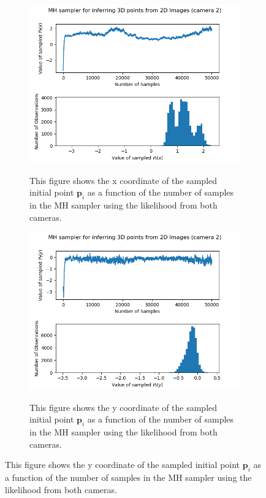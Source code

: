 \documentclass[10pt]{article}
\begin{document}
\begin{figure}[h!]
\centering
\begin{subfigure}[]{.320\textwidth}
  \centering
  \includegraphics[width=1\linewidth]{figures/p_f_x12.png}
  \label{fig:t4pix}
\caption{This figure shows the x coordinate of the sampled initial point $\mathbf{p}_i$ as a function of the number of samples in the MH sampler using the likelihood from both cameras.}
\end{subfigure}
\begin{subfigure}[]{.320\textwidth}
  \centering
  \includegraphics[width=1\linewidth]{figures/p_f_y12.png}
  \label{fig:t4piy}
\caption{This figure shows the y coordinate of the sampled initial point $\mathbf{p}_i$ as a function of the number of samples in the MH sampler using the likelihood from both cameras.}

\end{subfigure}
\end{figure}
\end{document}
